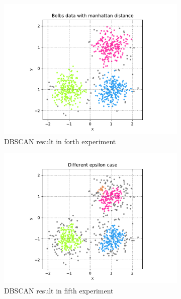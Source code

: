 \begin{figure}[h]
	\begin{subfigure}{0.33\textwidth}
		\centering
		\includegraphics[width=\linewidth]{figures/4-bolb}  
		\caption{DBSCAN result in forth experiment}
		\label{fig:p2-1}
	\end{subfigure}
	\begin{subfigure}{0.33\textwidth}
		\centering
		\includegraphics[width=\linewidth]{figures/5-epsilon}
		\caption{DBSCAN result in fifth experiment}
		\label{fig:p2-2}
	\end{subfigure}
	\begin{subfigure}{0.33\textwidth}
		\centering

\end{subfigure}
\end{figure}
